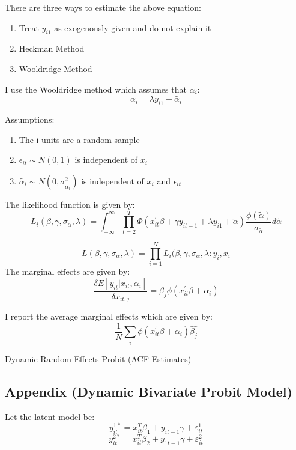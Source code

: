 \documentclass[12pt]{article}
\begin{document}
There are three ways to estimate the above equation: 
\begin{enumerate}
\item Treat $y_{i1}$ as exogenously given and do not explain it
\item Heckman Method
\item Wooldridge Method
\end{enumerate} 
I use the Wooldridge method which assumes that $\alpha_{i}$:
$$\alpha_{i} = \lambda y_{i1} + \tilde{\alpha_{i}}$$

Assumptions: 

\begin{enumerate}
\item The i-units are a random sample
\item $\epsilon_{it} \sim N(0,1)$ is independent of $x_{i}$
\item $\tilde{\alpha_{i}} \sim N(0,\sigma_{\tilde{\alpha_{i}}}^{2})$ is independent of
  $x_{i}$ and $\epsilon_{it}$
\end{enumerate}

The likelihood function is given by:
$$ L_{i}(\beta, \gamma, \sigma_{\alpha},\lambda)= \int_{-\infty}^{\infty}
\prod_{t=2}^{T}\Phi(x^{'}_{it}\beta + \gamma y_{it-1} + \lambda y_{i1} +
\tilde{\alpha}) \frac{\phi(\tilde{\alpha})}{\sigma_{\tilde{\alpha}}}
d\tilde{\alpha}$$ 

$$ L(\beta, \gamma, \sigma_{\alpha},\lambda) = \prod_{i=1}^{N}L_{i}(\beta, \gamma, \sigma_{\alpha},\lambda:y_{i},x_{i}$$
The marginal effects are given by:
\begin{equation}
\frac{\delta E[y_{it}|x_{it}, \alpha_{i}]}{\delta x_{it,j}} =
\beta_{j}\phi(x_{it}^{'} \beta + \alpha_{i})
\end{equation}

I report the average marginal effects which are given by: 
$$ \frac{1}{N} \sum_{i}\phi( x_{it}^{'} \beta + \alpha_{i})
\hat{\beta_{j}}$$

\begin{center}
\begin{table}[H]
\caption{Dynamic Random Effects Probit (ACF Estimates)}
\label{tab:dynprobitacf}

\end{table}
\end{center}
\restoregeometry
\subsection{Appendix (Dynamic Bivariate Probit Model)}\label{apendix:bivariate}
Let the latent model be: 
$$y^{1*}_{it}= x_{it}^{T}\beta_{1} + y_{it-1}\gamma + \varepsilon_{it}^{1}$$
$$y^{2*}_{it}= x_{it}^{T}\beta_{2} +y_{1t-1}\gamma + \varepsilon_{it}^{2}$$
\end{document}
